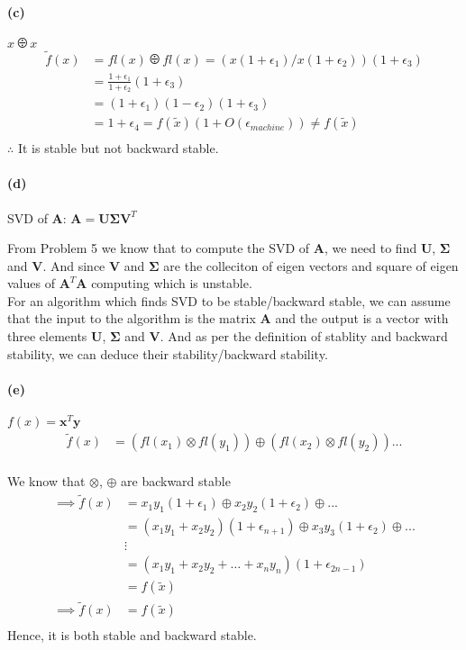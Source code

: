 \documentclass[12pt, letterpaper]{article}
\begin{document}
\paragraph{(c)} $x \odiv x$\\

\begin{align*}
  \tilde{f}(x) &= fl(x) \odiv fl(x) = (x(1 + \epsilon_1) / x(1 + \epsilon_2))(1 + \epsilon_3)\\
  &= \frac{1 + \epsilon_1}{1 + \epsilon_2}(1 + \epsilon_3)\\
  &= (1 + \epsilon_1)(1 - \epsilon_2)(1 + \epsilon_3)\\
  &= 1 + \epsilon_4 = f(\tilde{x})(1 + O(\epsilon_{machine})) \not = f(\tilde{x})\\
\end{align*}
$\therefore$ It is stable but not backward stable.

\paragraph{(d)} SVD of \textbf{A}: $\mathbf{A} = \mathbf{U\Sigma V}^T$

From Problem 5 we know that to compute the SVD of \textbf{A}, we need to find \textbf{U}, $\mathbf{\Sigma}$ and \textbf{V}. And since \textbf{V} and $\mathbf{\Sigma}$ are the colleciton of eigen vectors and square of eigen values of $\mathbf{A}^T\mathbf{A}$ computing which is unstable.\\

For an algorithm which finds SVD to be stable/backward stable, we can assume that the input to the algorithm is the matrix \textbf{A} and the output is a vector with three elements \textbf{U}, $\mathbf{\Sigma}$ and \textbf{V}. And as per the definition of stablity and backward stability, we can deduce their stability/backward stability.

\paragraph{(e)} $f(x) = \mathbf{x}^T\mathbf{y}$\\

\begin{align*}
  \tilde{f}(x) &= (fl(x_1) \otimes fl(y_1)) \oplus (fl(x_2) \otimes fl(y_2)) ...\\
\end{align*}

We know that $\otimes$, $\oplus$ are backward stable
\begin{align*}
  \implies \tilde{f}(x) &= x_1y_1(1 + \epsilon_1) \oplus x_2y_2(1 + \epsilon_2) \oplus ...\\
  &= (x_1y_1 + x_2y_2)(1 + \epsilon_{n+1}) \oplus x_3y_3(1 + \epsilon_2) \oplus ...\\
  &\vdots\\
  &= (x_1y_1 + x_2y_2 + \dots + x_ny_n)(1 + \epsilon_{2n-1})\\
  &= f(\tilde{x})\\
  \implies \tilde{f}(x) &= f(\tilde{x})\\
\end{align*}
Hence, it is both stable and backward stable.
\end{document}
